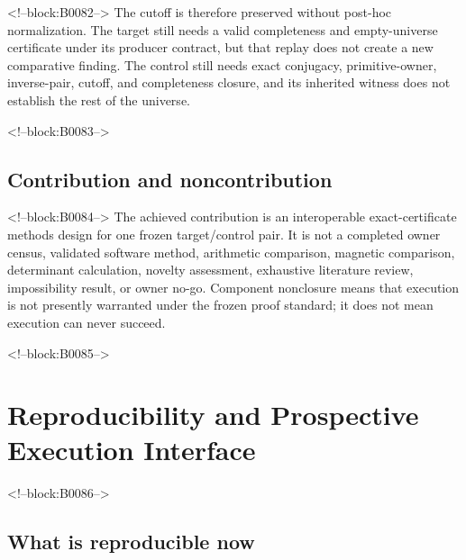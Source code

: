 \documentclass[11pt,a4paper]{article}
\begin{document}
<!--block:B0082-->
The cutoff is therefore preserved without post-hoc normalization. The target still needs a valid completeness and empty-universe certificate under its producer contract, but that replay does not create a new comparative finding. The control still needs exact conjugacy, primitive-owner, inverse-pair, cutoff, and completeness closure, and its inherited witness does not establish the rest of the universe.

<!--block:B0083-->
\hypertarget{contribution-and-noncontribution}{%
\subsection{Contribution and noncontribution}\label{contribution-and-noncontribution}}

<!--block:B0084-->
The achieved contribution is an interoperable exact-certificate methods design for one frozen target/control pair. It is not a completed owner census, validated software method, arithmetic comparison, magnetic comparison, determinant calculation, novelty assessment, exhaustive literature review, impossibility result, or owner no-go. Component nonclosure means that execution is not presently warranted under the frozen proof standard; it does not mean execution can never succeed.

<!--block:B0085-->
\hypertarget{reproducibility-and-prospective-execution-interface}{%
\section{Reproducibility and Prospective Execution Interface}\label{reproducibility-and-prospective-execution-interface}}

<!--block:B0086-->
\hypertarget{what-is-reproducible-now}{%
\subsection{What is reproducible now}\label{what-is-reproducible-now}}
\end{document}
